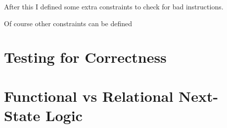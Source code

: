 After this I defined some extra constraints to check for bad instructions.

Of course other constraints can be defined



\section{Testing for Correctness}\label{sec:corectness}

\section{Functional vs Relational Next-State Logic}\label{sec:funcVSrel}